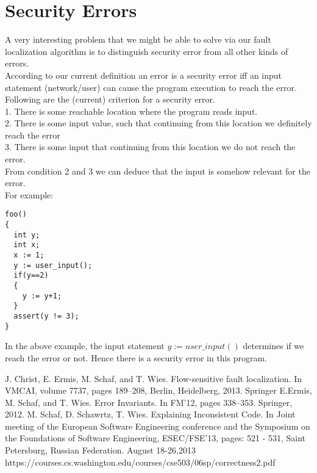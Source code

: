 \documentclass{article}
\begin{document}
\section{Security Errors}
A very interesting problem that we might be able to solve via our fault localization algorithm is to distinguish security error from all other kinds of errors. \\
According to our current definition an error is a security error iff an input statement (network/user) can cause the program execution to reach the error. Following are the (current) criterion for a security error.\\
1. There is some reachable location where the program reads input.\\
2. There is some input value, such that continuing from this location we definitely reach
the error\\
3. There is some input that continuing from this location we do not reach the error.
\\
From condition 2 and 3 we can deduce that the input is somehow relevant for the error.\\
For example:
\begin{lstlisting}
foo()
{
  int y;
  int x;
  x := 1;
  y := user_input();
  if(y==2) 
  {
    y := y+1;
  }
  assert(y != 3);
}
\end{lstlisting}
In the above example, the input statement $y := user\_input()$ determines if we reach the error or not. Hence there is a security error in this program.



\begin{thebibliography}{9}
J. Christ, E. Ermis, M. Schaf, and T. Wies. Flow-sensitive fault localization. In VMCAI, volume 7737, pages 189–208, Berlin, Heidelberg, 2013. Springer
E.Ermis, M. Schaf, and T. Wies. Error Invariants. In FM’12, pages 338–353. Springer, 2012.
M. Schaf, D. Schawrtz, T. Wies. Explaining Inconsistent Code. In Joint meeting of the European Software Engineering conference and the Symposium on the Foundations of Software Engineering, ESEC/FSE’13, pages: 521 - 531, Saint Petersburg, Russian Federation. August 18-26,2013  
https://courses.cs.washington.edu/courses/cse503/06sp/correctness2.pdf


\end{thebibliography}
\end{document}
